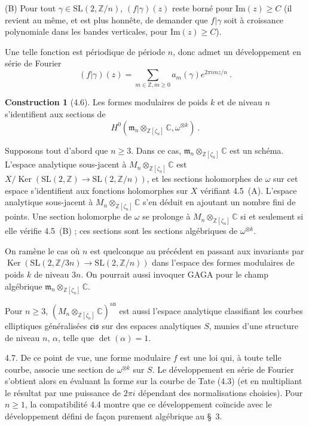 \documentclass[12pt,a4paper]{amsart}
\theoremstyle{plain}
\theoremstyle{definition}
\newtheorem{construction}[proposition]{Construction}
\theoremstyle{remark}
\DeclareMathOperator{\Ker}{Ker}
\newcommand{\ZZ}{\mathbb{Z}}
\newcommand{\CC}{\mathbb{C}}
\begin{document}
(B) Pour tout $\gamma \in \mathrm{SL}(2, \ZZ/n)$, $(f|\gamma)(z)$ reste born\'e pour $\mathrm{Im}(z) \geq C$ (il revient au m\^eme, et est plus honn\^ete, de demander que $f|\gamma$ soit \`a croissance polynomiale dans les bandes verticales, pour $\mathrm{Im}(z) \geq C$).

Une telle fonction est p\'eriodique de p\'eriode $n$, donc admet un d\'eveloppement en s\'erie de Fourier
\[
(f|\gamma)(z) = \sum_{m \in \ZZ, m \geq 0} a_m(\gamma) e^{2\pi i m z/n} \ .
\]

\begin{construction}[4.6]
Les formes modulaires de poids $k$ et de niveau $n$ s'identifient aux sections de
\[
H^0(\mathfrak{m}_n \otimes_{\ZZ[\zeta_n]} \CC, \omega^{\otimes k}) \ .
\]
\end{construction}

Supposons tout d'abord que $n \geq 3$. Dans ce cas, $\mathfrak{m}_n \otimes_{\ZZ[\zeta_n]} \CC$ est un sch\'ema. L'espace analytique sous-jacent \`a $M_n \otimes_{\ZZ[\zeta_n]} \CC$ est $X / \Ker(\mathrm{SL}(2, \ZZ) \rightarrow \mathrm{SL}(2, \ZZ/n))$, et les sections holomorphes de $\omega$ sur cet espace s'identifient aux fonctions holomorphes sur $X$ v\'erifiant 4.5~(A). L'espace analytique sous-jacent \`a $M_n \otimes_{\ZZ[\zeta_n]} \CC$ s'en d\'eduit en ajoutant un nombre fini de points. Une section holomorphe de $\omega$ se prolonge \`a $M_n \otimes_{\ZZ[\zeta_n]} \CC$ si et seulement si elle v\'erifie 4.5~(B) ; ces sections sont les sections alg\'ebriques de $\omega^{\otimes k}$.

On ram\`ene le cas o\`u $n$ est quelconque au pr\'ec\'edent en passant aux invariants par $\Ker(\mathrm{SL}(2, \ZZ/3n) \rightarrow \mathrm{SL}(2, \ZZ/n))$ dans l'espace des formes modulaires de poids $k$ de niveau $3n$. On pourrait aussi invoquer GAGA pour le champ alg\'ebrique $\mathfrak{m}_n \otimes_{\ZZ[\zeta_n]} \CC$.

Pour $n \geq 3$, $(M_n \otimes_{\ZZ[\zeta_n]} \CC)^{\mathrm{an}}$ est aussi l'espace analytique classifiant les courbes elliptiques g\'en\'eralis\'ees $\mathfrak{cis}$ sur des espaces analytiques $S$, munies d'une structure de niveau $n$, $\alpha$, telle que $\det(\alpha) = 1$.

4.7. De ce point de vue, une forme modulaire $f$ est une loi qui, \`a toute telle courbe, associe une section de $\omega^{\otimes k}$ sur $S$. Le d\'eveloppement en s\'erie de Fourier s'obtient alors en \'evaluant la forme sur la courbe de Tate (4.3) (et en multipliant le r\'esultat par une puissance de $2\pi i$ d\'ependant des normalisations choisies). Pour $n \geq 1$, la compatibilit\'e 4.4 montre que ce d\'eveloppement co\"incide avec le d\'eveloppement d\'efini de fa\c{c}on purement alg\'ebrique au \S~3.
\end{document}
